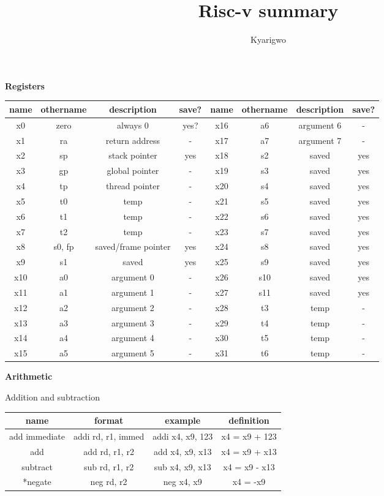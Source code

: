 \documentclass{article}
\author{Kyarigwo}
\title{Risc-v summary}
\begin{document}
\begin{center}

  \textbf{Registers}

  \begin{tabular}{|c|c|c|c||c|c|c|c|}
    \hline
    name & othername & description & save? &  name & othername & description & save? \\
    \hline
    x0 & zero & always 0 & yes? & x16 & a6  & argument 6 & - \\
    x1 & ra  & return address  & - & x17 & a7  & argument 7  & - \\
    x2 & sp  & stack pointer  & yes & x18 & s2  & saved  & yes \\
    x3 & gp  & global pointer  & - & x19 & s3  & saved  & yes \\
    x4 & tp  & thread pointer  & - & x20 & s4  & saved  & yes \\
    x5 & t0  & temp  & - & x21 & s5  & saved  & yes \\
    x6 & t1  & temp  & - & x22 & s6  & saved  & yes \\
    x7 & t2  & temp  & - & x23 & s7  & saved  & yes \\
    x8 & s0, fp & saved/frame pointer & yes & x24 & s8  & saved  & yes \\
    x9 & s1  & saved  & yes & x25 & s9  & saved  & yes \\
    x10 & a0  & argument 0  & - & x26 & s10  & saved  & yes \\
    x11 & a1  & argument 1  & - & x27 & s11  & saved  & yes \\
    x12 & a2  & argument 2  & - & x28 & t3  & temp  & - \\
    x13 & a3  & argument 3  & - & x29 & t4  & temp  & - \\
    x14 & a4  & argument 4  & - & x30 & t5  & temp  & - \\
    x15 & a5  & argument 5  & - & x31 & t6  & temp  & - \\
  \hline
  \end{tabular}

  \textbf{Arithmetic}

  Addition and subtraction

  \begin{tabular}{|c|c|c|c|}
    \hline
    name          & format             & example          & definition    \\
    \hline
    add immediate & addi rd, r1, immed & addi x4, x9, 123 & x4 = x9 + 123 \\
    add           & add  rd, r1, r2    & add x4, x9, x13  & x4 = x9 + x13 \\
    subtract      & sub  rd, r1, r2    & sub x4, x9, x13  & x4 = x9 - x13 \\
    *negate        & neg rd, r2         & neg x4, x9       & x4 = -x9      \\
    \hline
  \end{tabular}


\end{center}
\end{document}
